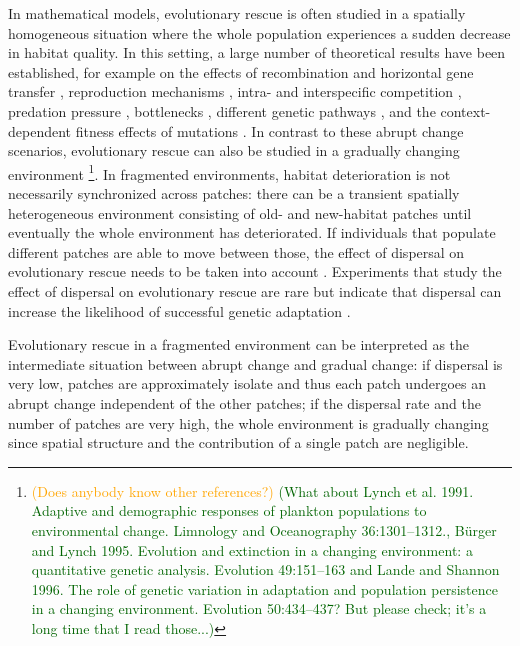 \documentclass[a4paper,11pt]{article}
\newcommand{\hildegard}[1]{\textcolor{darkgreen}{(#1)}}
\newcommand{\pete}[1]{\textcolor{orange}{(#1)}}
\newcommand{\chg}[1]{\textcolor{change}{#1}}
\begin{document}
In mathematical models, evolutionary rescue is often studied in a spatially homogeneous situation where the whole population experiences a sudden decrease in habitat quality. In this setting, a large number of theoretical results have been established, for example on the effects of recombination \citep{uecker_2015} and horizontal gene transfer \citep{tazzyman_2014}, reproduction mechanisms \citep{glemin_2013,uecker_2017}, intra- and interspecific competition \citep{osmond_2013}, predation pressure \chg{\citep{yamamichi_2015}}, bottlenecks \citep{martin_2013}, different genetic pathways \citep{osmond_2019}, and the context-dependent fitness effects of mutations \citep{anciaux_2018}. \chg{In contrast to these abrupt change scenarios, evolutionary rescue can also be studied in a gradually changing environment \citep[e.g.][]{osmond_2017}}\footnote{\pete{Does anybody know other references?} \hildegard{What about Lynch et al. 1991. Adaptive and  demographic responses of plankton populations to environmental change. Limnology and Oceanography 36:1301--1312., B{\"u}rger and Lynch 1995. Evolution and extinction in a changing environment: a quantitative genetic analysis. Evolution 49:151--163 and Lande and Shannon 1996. The role of  genetic  variation  in adaptation and population persistence in a changing environment. Evolution 50:434--437? But please check; it's a long time that I read those...}}. 
In fragmented environments, habitat deterioration is not necessarily synchronized across patches: there can be a transient spatially heterogeneous environment consisting of old- and new-habitat patches until eventually the whole environment has deteriorated. If individuals that populate different patches are able to move between those, the effect of dispersal on evolutionary rescue needs to be taken into account \citep{uecker_2014, tomasini_2019}. Experiments that study the effect of dispersal on evolutionary rescue are rare but indicate that  dispersal can increase the likelihood of successful genetic adaptation \citep{bell_2011}. 

\chg{Evolutionary rescue in a fragmented environment can be interpreted as the intermediate situation between abrupt change and gradual change: if dispersal is very low, patches are approximately isolate and thus each patch undergoes an abrupt change independent of the other patches; if the dispersal rate and the number of patches are very high, the whole environment is gradually changing since spatial structure and the contribution of a single patch are negligible.}
\end{document}
